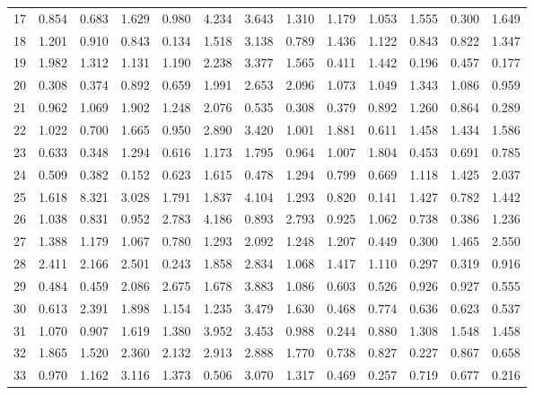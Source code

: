 \begin{tabular}{lrrrrrrrrrrrr}
17  &  0.854 &  0.683 &  1.629 &  0.980 &  4.234 &  3.643 &  1.310 &  1.179 &  1.053 &  1.555 &  0.300 &  1.649 \\
18  &  1.201 &  0.910 &  0.843 &  0.134 &  1.518 &  3.138 &  0.789 &  1.436 &  1.122 &  0.843 &  0.822 &  1.347 \\
19  &  1.982 &  1.312 &  1.131 &  1.190 &  2.238 &  3.377 &  1.565 &  0.411 &  1.442 &  0.196 &  0.457 &  0.177 \\
20  &  0.308 &  0.374 &  0.892 &  0.659 &  1.991 &  2.653 &  2.096 &  1.073 &  1.049 &  1.343 &  1.086 &  0.959 \\
21  &  0.962 &  1.069 &  1.902 &  1.248 &  2.076 &  0.535 &  0.308 &  0.379 &  0.892 &  1.260 &  0.864 &  0.289 \\
22  &  1.022 &  0.700 &  1.665 &  0.950 &  2.890 &  3.420 &  1.001 &  1.881 &  0.611 &  1.458 &  1.434 &  1.586 \\
23  &  0.633 &  0.348 &  1.294 &  0.616 &  1.173 &  1.795 &  0.964 &  1.007 &  1.804 &  0.453 &  0.691 &  0.785 \\
24  &  0.509 &  0.382 &  0.152 &  0.623 &  1.615 &  0.478 &  1.294 &  0.799 &  0.669 &  1.118 &  1.425 &  2.037 \\
25  &  1.618 &  8.321 &  3.028 &  1.791 &  1.837 &  4.104 &  1.293 &  0.820 &  0.141 &  1.427 &  0.782 &  1.442 \\
26  &  1.038 &  0.831 &  0.952 &  2.783 &  4.186 &  0.893 &  2.793 &  0.925 &  1.062 &  0.738 &  0.386 &  1.236 \\
27  &  1.388 &  1.179 &  1.067 &  0.780 &  1.293 &  2.092 &  1.248 &  1.207 &  0.449 &  0.300 &  1.465 &  2.550 \\
28  &  2.411 &  2.166 &  2.501 &  0.243 &  1.858 &  2.834 &  1.068 &  1.417 &  1.110 &  0.297 &  0.319 &  0.916 \\
29  &  0.484 &  0.459 &  2.086 &  2.675 &  1.678 &  3.883 &  1.086 &  0.603 &  0.526 &  0.926 &  0.927 &  0.555 \\
30  &  0.613 &  2.391 &  1.898 &  1.154 &  1.235 &  3.479 &  1.630 &  0.468 &  0.774 &  0.636 &  0.623 &  0.537 \\
31  &  1.070 &  0.907 &  1.619 &  1.380 &  3.952 &  3.453 &  0.988 &  0.244 &  0.880 &  1.308 &  1.548 &  1.458 \\
32  &  1.865 &  1.520 &  2.360 &  2.132 &  2.913 &  2.888 &  1.770 &  0.738 &  0.827 &  0.227 &  0.867 &  0.658 \\
33  &  0.970 &  1.162 &  3.116 &  1.373 &  0.506 &  3.070 &  1.317 &  0.469 &  0.257 &  0.719 &  0.677 &  0.216 \\

\end{tabular}
